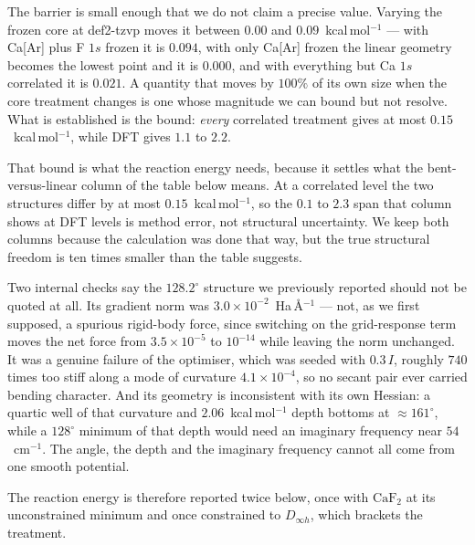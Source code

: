 \documentclass[11pt,a4paper]{article}
\theoremstyle{plain}
\theoremstyle{definition}
\theoremstyle{remark}
\begin{document}
The barrier is small enough that we do not claim a precise value. Varying the frozen
core at def2-tzvp moves it between $0.00$ and $0.09$~kcal\,mol$^{-1}$ --- with
Ca[Ar] plus F $1s$ frozen it is $0.094$, with only Ca[Ar] frozen the linear geometry
becomes the lowest point and it is $0.000$, and with everything but Ca $1s$ correlated
it is $0.021$. A quantity that moves by $100\%$ of its own size when the core
treatment changes is one whose magnitude we can bound but not resolve. What is
established is the bound: \emph{every} correlated treatment gives at most
$0.15$~kcal\,mol$^{-1}$, while DFT gives $1.1$ to $2.2$.

That bound is what the reaction energy needs, because it settles what the
bent-versus-linear column of the table below means. At a correlated level the two
structures differ by at most $0.15$~kcal\,mol$^{-1}$, so the $0.1$ to $2.3$ span that
column shows at DFT levels is method error, not structural uncertainty. We keep both
columns because the calculation was done that way, but the true structural freedom is
ten times smaller than the table suggests.

Two internal checks say the $128.2^\circ$ structure we previously reported should
not be quoted at all. Its gradient norm was $3.0\times10^{-2}$~Ha\,\AA$^{-1}$ ---
not, as we first supposed, a spurious rigid-body force, since switching on the
grid-response term moves the net force from $3.5\times10^{-5}$ to $10^{-14}$ while
leaving the norm unchanged. It was a genuine failure of the optimiser, which was
seeded with $0.3\,I$, roughly $740$ times too stiff along a mode of curvature
$4.1\times10^{-4}$, so no secant pair ever carried bending character. And its
geometry is inconsistent with its own Hessian: a quartic well of that curvature and
$2.06$~kcal\,mol$^{-1}$ depth bottoms at $\approx161^\circ$, while a
$128^\circ$ minimum of that depth would need an imaginary frequency near
$54$~cm$^{-1}$. The angle, the depth and the imaginary frequency cannot all come
from one smooth potential.

The reaction energy is therefore reported twice below, once with $\mathrm{CaF_2}$
at its unconstrained minimum and once constrained to $D_{\infty h}$, which brackets
the treatment.
\end{document}
